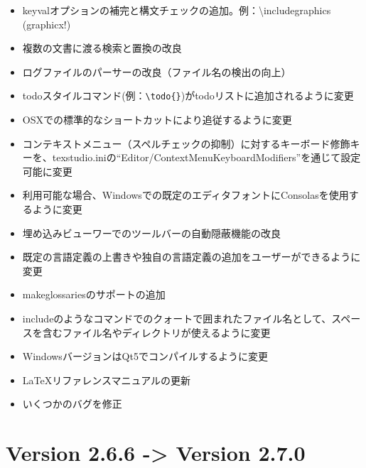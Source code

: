 \begin{itemize}
\item
  keyvalオプションの補完と構文チェックの追加。例：\textbackslash{}includegraphics (graphicx!)
\item
  複数の文書に渡る検索と置換の改良
\item
  ログファイルのパーサーの改良（ファイル名の検出の向上）
\item
  todoスタイルコマンド(例：\lstinline!\todo{}!)がtodoリストに追加されるように変更
\item
  OSXでの標準的なショートカットにより追従するように変更
\item
  コンテキストメニュー（スペルチェックの抑制）に対するキーボード修飾キーを、texstudio.iniの``Editor/ContextMenuKeyboardModifiers''を通じて設定可能に変更
\item
  利用可能な場合、Windowsでの既定のエディタフォントにConsolasを使用するように変更
\item
  埋め込みビューワーでのツールバーの自動隠蔽機能の改良
\item
  既定の言語定義の上書きや独自の言語定義の追加をユーザーができるように変更
\item
  makeglossariesのサポートの追加
\item
  includeのようなコマンドでのクォートで囲まれたファイル名として、スペースを含むファイル名やディレクトリが使えるように変更
\item
  WindowsバージョンはQt5でコンパイルするように変更
\item
  LaTeXリファレンスマニュアルの更新
\item
  いくつかのバグを修正
\end{itemize}

\section{Version 2.6.6 -\textgreater{} Version 2.7.0}

